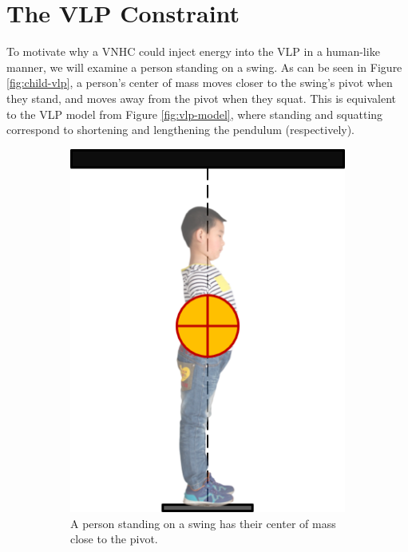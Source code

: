 \section{The VLP Constraint}
To motivate why a VNHC could inject energy into the VLP in a human-like
manner, we will examine a person standing on a swing.
As can be seen in Figure \ref{fig:child-vlp}, a person's center of mass moves closer
to the swing's pivot when they stand, and moves away from the pivot when they
squat.
This is equivalent to the VLP model from Figure \ref{fig:vlp-model}, where
standing and squatting correspond to shortening and lengthening the pendulum
(respectively).
\begin{figure}
   \centering
   \begin{subfigure}[t]{0.45\textwidth}
      \includegraphics[]{images/child_vlp_standing.png}
      \caption{A person standing on a swing has their center of mass 
      close to the pivot.}
   \end{subfigure}
   \hfill
   \begin{subfigure}[t]{0.45\textwidth}

\end{subfigure}
\end{figure}
